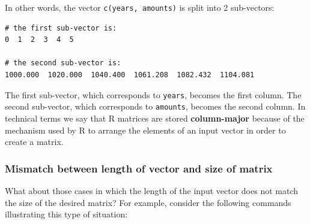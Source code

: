 \documentclass[
]{book}
\begin{document}
In other words, the vector \texttt{c(years,\ amounts)} is split into 2 sub-vectors:

\begin{verbatim}
# the first sub-vector is:
0  1  2  3  4  5

# the second sub-vector is:
1000.000  1020.000  1040.400  1061.208  1082.432  1104.081
\end{verbatim}

The first sub-vector, which corresponds to \texttt{years}, becomes the first column.
The second sub-vector, which corresponds to \texttt{amounts}, becomes the second
column. In technical terms we say that R matrices are stored
\textbf{column-major} because of the mechanism used by R to arrange the elements of
an input vector in order to create a matrix.

\hypertarget{mismatch-between-length-of-vector-and-size-of-matrix}{%
\subsubsection*{Mismatch between length of vector and size of matrix}\label{mismatch-between-length-of-vector-and-size-of-matrix}}

What about those cases in which the length of the input vector does not match
the size of the desired matrix? For example, consider the following commands
illustrating this type of situation:
\end{document}
